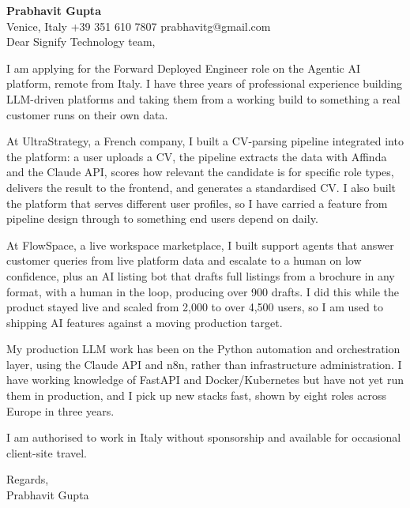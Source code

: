 \documentclass[a4paper,10.5pt]{article}
\begin{document}
\textbf{Prabhavit Gupta}\\
Venice, Italy \textbar{} +39 351 610 7807 \textbar{} prabhavitg@gmail.com\\[10pt]
Dear Signify Technology team,

I am applying for the Forward Deployed Engineer role on the Agentic AI platform, remote from Italy. I have three years of professional experience building LLM-driven platforms and taking them from a working build to something a real customer runs on their own data.

At UltraStrategy, a French company, I built a CV-parsing pipeline integrated into the platform: a user uploads a CV, the pipeline extracts the data with Affinda and the Claude API, scores how relevant the candidate is for specific role types, delivers the result to the frontend, and generates a standardised CV. I also built the platform that serves different user profiles, so I have carried a feature from pipeline design through to something end users depend on daily.

At FlowSpace, a live workspace marketplace, I built support agents that answer customer queries from live platform data and escalate to a human on low confidence, plus an AI listing bot that drafts full listings from a brochure in any format, with a human in the loop, producing over 900 drafts. I did this while the product stayed live and scaled from 2,000 to over 4,500 users, so I am used to shipping AI features against a moving production target.

My production LLM work has been on the Python automation and orchestration layer, using the Claude API and n8n, rather than infrastructure administration. I have working knowledge of FastAPI and Docker/Kubernetes but have not yet run them in production, and I pick up new stacks fast, shown by eight roles across Europe in three years.

I am authorised to work in Italy without sponsorship and available for occasional client-site travel.

Regards,\\
Prabhavit Gupta
\end{document}
